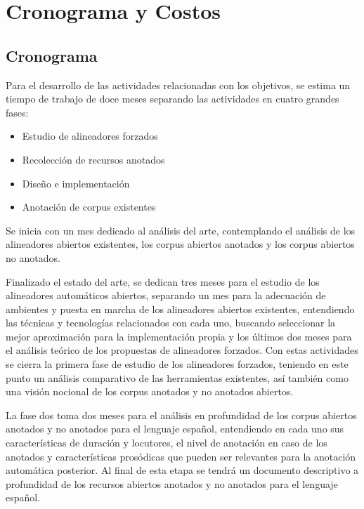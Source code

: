 \chapter{Cronograma y Costos}

\section{Cronograma}

Para el desarrollo de las actividades relacionadas con los objetivos, se estima un tiempo de trabajo de doce meses separando las actividades en cuatro grandes fases:

\begin{itemize}
    \item Estudio de alineadores forzados 
    \item Recolección de recursos anotados
    \item Diseño e implementación 
    \item Anotación de corpus existentes
\end{itemize}

Se inicia con un mes dedicado al análisis del arte, contemplando el análisis de los alineadores abiertos existentes, los corpus abiertos anotados y los corpus abiertos no anotados.

Finalizado el estado del arte, se dedican tres meses para el estudio de los alineadores automáticos abiertos, separando un mes para la adecuación de ambientes y puesta en marcha de los alineadores abiertos existentes, entendiendo las técnicas y tecnologías relacionados con cada uno, buscando seleccionar la mejor aproximación para la implementación propia y los últimos dos meses para el análisis teórico de los propuestas de alineadores forzados. Con estas actividades se cierra la primera fase de estudio de los alineadores forzados, teniendo en este punto un análisis comparativo de las herramientas existentes, así también como una visión nocional de los corpus anotados y no anotados abiertos.

La fase dos toma dos meses para el análisis en profundidad de los corpus abiertos anotados y no anotados para el lenguaje español, entendiendo en cada uno sus características de duración y locutores, el nivel de anotación en caso de los anotados y características prosódicas que pueden ser relevantes para la anotación automática posterior. Al final de esta etapa se tendrá un documento descriptivo a profundidad de los recursos abiertos anotados y no anotados para el lenguaje español.

